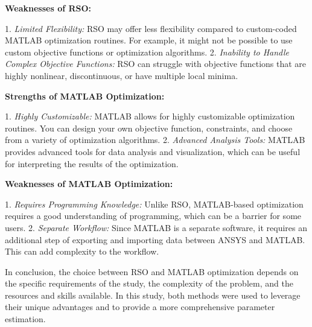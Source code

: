 \textbf{Weaknesses of RSO:}

	1. \textit{Limited Flexibility:} RSO may offer less flexibility compared to custom-coded MATLAB optimization routines. For example, it might not be possible to use custom objective functions or optimization algorithms.
	2. \textit{Inability to Handle Complex Objective Functions:} RSO can struggle with objective functions that are highly nonlinear, discontinuous, or have multiple local minima.

\textbf{Strengths of MATLAB Optimization:}

	1. \textit{Highly Customizable:} MATLAB allows for highly customizable optimization routines. You can design your own objective function, constraints, and choose from a variety of optimization algorithms.
	2. \textit{Advanced Analysis Tools:} MATLAB provides advanced tools for data analysis and visualization, which can be useful for interpreting the results of the optimization.

\textbf{Weaknesses of MATLAB Optimization:}

	1. \textit{Requires Programming Knowledge:} Unlike RSO, MATLAB-based optimization requires a good understanding of programming, which can be a barrier for some users.
	2. \textit{Separate Workflow:} Since MATLAB is a separate software, it requires an additional step of exporting and importing data between ANSYS and MATLAB. This can add complexity to the workflow.

In conclusion, the choice between RSO and MATLAB optimization depends on the specific requirements of the study, the complexity of the problem, and the resources and skills available. In this study, both methods were used to leverage their unique advantages and to provide a more comprehensive parameter estimation.



%






